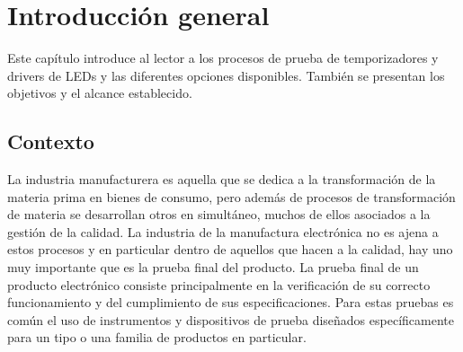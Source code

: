 
\chapter{Introducción general} %

\label{Chapter1} %


Este capítulo introduce al lector a los procesos de prueba de temporizadores y drivers de LEDs y las diferentes opciones disponibles. También se presentan los objetivos y el alcance establecido. 

\label{IntroGeneral}


\newcommand{\keyword}[1]{\textbf{#1}}
\newcommand{\tabhead}[1]{\textbf{#1}}
\newcommand{\code}[1]{\texttt{#1}}
\newcommand{\file}[1]{\texttt{\bfseries#1}}
\newcommand{\option}[1]{\texttt{\itshape#1}}
\newcommand{\grados}{$^{\circ}$}



\section{Contexto}

La industria manufacturera es aquella que se dedica a la transformación de la materia prima en bienes de consumo, pero además de procesos de transformación de materia se desarrollan otros en simultáneo, muchos de ellos asociados a la gestión de la calidad. La industria de la manufactura electrónica no es ajena a estos procesos y en particular dentro de aquellos que hacen a la calidad, hay uno muy importante que es la prueba final del producto. 
La prueba final de un producto electrónico consiste principalmente en la verificación de su correcto funcionamiento y del cumplimiento de sus especificaciones. Para estas pruebas es común el uso de instrumentos y dispositivos de prueba diseñados específicamente para un tipo o una familia de productos en particular.

